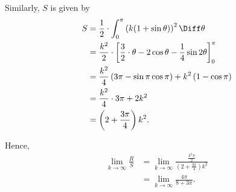 \begin{enumerate}
          Similarly, \(S\) is given by
          \begin{align*}
              S & = \frac{1}{2} \cdot \int_{0}^{\pi} \left(k (1 + \sin \theta)\right)^2 \Diff \theta                               \\
                & = \frac{k^2}{2} \cdot \left[\frac{3}{2} \cdot \theta - 2 \cos \theta - \frac{1}{4} \sin 2\theta\right]_{0}^{\pi} \\
                & = \frac{k^2}{4} \left(3 \pi - \sin \pi \cos \pi\right) + k^2 \left(1 - \cos \pi\right)                           \\
                & = \frac{k^2}{4} \cdot 3\pi + 2k^2                                                                                \\
                & = \left(2 + \frac{3\pi}{4}\right) k^2.
          \end{align*}

          Hence,
          \begin{align*}
              \lim_{k \to \infty} \frac{R}{S} & = \lim_{k \to \infty} \frac{\frac{k^2 \pi}{2}}{\left(2 + \frac{3\pi}{4}\right) k^2} \\
                                              & = \lim_{k \to \infty} \frac{4 \pi}{8 + 3 \pi}.
          \end{align*}
\end{enumerate}